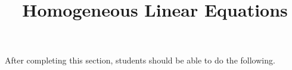\documentclass{ximera}
\title{Homogeneous Linear Equations}
\begin{document}
\begin{abstract}
\end{abstract}

\maketitle

\begin{sectionOutcomes}

After completing this section, students should be able to do the following.

\begin{itemize}
	
\end{itemize}

\end{sectionOutcomes}
\end{document}
